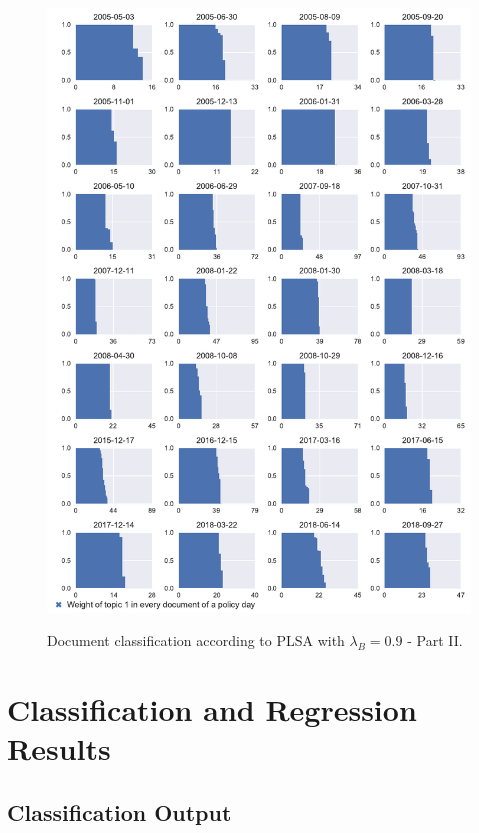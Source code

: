 \documentclass[11pt,a4paper,english,oneside]{book}
\numberwithin{equation}{chapter}
\begin{document}
\begin{figure}
	\caption{Document classification according to PLSA with $\lambda_B = 0.9$ - Part II.}
	\centering
	\includegraphics[scale=0.8]{Images/docsplit02_bgLamb_0_9.pdf}
	\label{classdoc02L09}
\end{figure}

\renewcommand{\theequation}{D.\arabic{equation}}


\chapter{Classification and Regression Results}\label{AppendixD}

 

\section{Classification Output}\label{AppendixD1}
\end{document}
